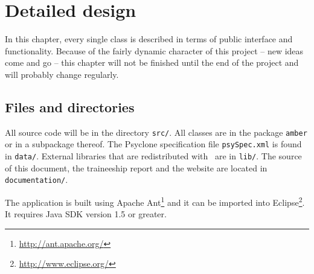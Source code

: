 \chapter{Detailed design}

In this chapter, every single class is described in terms of public interface
and functionality. Because of the fairly dynamic character of this project --
new ideas come and go -- this chapter will not be finished until the end of the
project and will probably change regularly.

\section{Files and directories}

All source code will be in the directory \texttt{src/}. All classes are in the
package \texttt{amber} or in a subpackage thereof. The Psyclone specification
file \texttt{psySpec.xml} is found in \texttt{data/}. External libraries that
are redistributed with \Amber\ are in \texttt{lib/}. The source of this
document, the traineeship report and the website are located in
\texttt{documentation/}.

The application is built using Apache
Ant\footnote{\url{http://ant.apache.org/}} and it can be imported into
Eclipse\footnote{\url{http://www.eclipse.org/}}. It requires Java SDK version
1.5 or greater.











